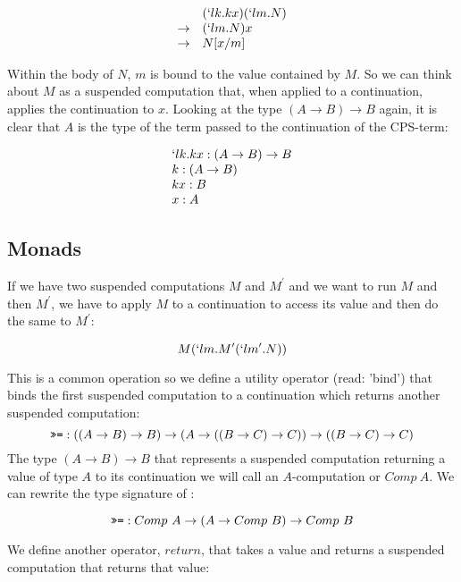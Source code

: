   \[
  \begin{array}{rl}
      & (`lk.kx)(`lm.N) \\
      \to & (`lm.N)x \\
      \to & N[x/m]
  \end{array}
  \]
  
  Within the body of $N$, $m$ is bound to the value contained by $M$.
  So we can think about $M$ as a suspended computation that, when applied
  to a continuation, applies the continuation to $x$. Looking at
  the type $(A \to B) \to B$ again, it is clear that $A$ is the type
  of the term passed to the continuation of the CPS-term:
  
  \[
  \begin{array}{l}
    `lk.kx : (A \to B) \to B \\
    k : (A \to B) \\
    kx : B \\
    x : A \\
  \end{array} 
  \]
  
 
  \subsection{Monads}
  
  If we have two suspended computations $M$ and $M^\prime$ and we want to
  run $M$ and then $M^\prime$, we have to apply $M$ to a continuation
  to access its value and then do the same to $M^\prime$:
  
  \[
    M(`lm.M^\prime(`lm^\prime.N))
  \]
  
  This is a common operation so we define a utility operator \mono{>>=} 
    (read: 'bind') 
  that binds the first suspended computation to a continuation which returns another suspended computation:
  \[
    \texttt{>>=} : ((A \to B) \to B) \to (A \to ((B \to C) \to C)) \to ((B \to C) \to C)
  \]
  The type $(A \to B) \to B$ that represents a suspended computation returning
  a value of type $A$ to its continuation we will call an $A$-computation or
  $Comp\ A$. We can rewrite the type signature of \mono{>>=}:
  
  \[
    \texttt{>>=} : Comp\ A \to (A \to Comp\ B) \to Comp\ B
  \]
  
  We define another operator, $return$, that takes a value and returns a 
  suspended computation that returns that value:
  
